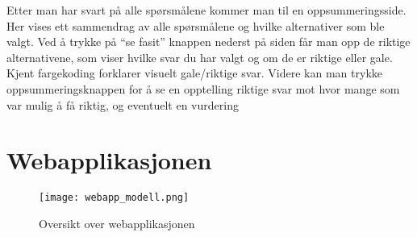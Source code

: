\documentclass[../main.tex]{subfiles}
\begin{document}
Etter man har svart på alle spørsmålene kommer man til en oppsummeringsside. Her vises ett sammendrag av alle spørsmålene og hvilke alternativer som ble valgt. Ved å trykke på “se fasit” knappen nederst på siden får man opp de riktige alternativene, som viser hvilke svar du har valgt og om de er riktige eller gale. Kjent fargekoding forklarer visuelt gale/riktige svar.
Videre kan man trykke oppsummeringsknappen for å se en opptelling riktige svar mot hvor mange som var mulig å få riktig, og eventuelt en vurdering






\section{Webapplikasjonen}

\begin{figure}[H]
  \centering
  \texttt{[image: webapp\_modell.png]}
  \caption{Oversikt over webapplikasjonen}
\end{figure}
\end{document}
